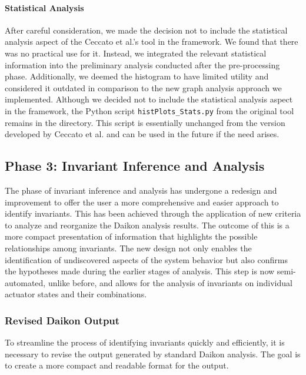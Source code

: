 \paragraph{Statistical Analysis} After careful consideration, we made the decision not to include the statistical analysis aspect of the Ceccato et al.'s tool in the framework. We found that there was no practical use for it. Instead, we integrated the relevant statistical information into the preliminary analysis conducted after the pre-processing phase. Additionally, we deemed the histogram to have limited utility and considered it outdated in comparison to the new graph analysis approach we implemented. \newline
Although we decided not to include the statistical analysis aspect in the framework, the Python script \texttt{histPlots\_Stats.py} from the original tool remains in the directory. This script is essentially unchanged from the version developed by Ceccato et al. and can be used in the future if the need arises. 

\subsection{Phase 3: Invariant Inference and Analysis}
\label{subsec:4_improve_invariants}
The phase of invariant inference and analysis has undergone a redesign and improvement to offer the user a more comprehensive and easier approach to identify invariants. This has been achieved through the application of new criteria to analyze and reorganize the Daikon analysis results. The outcome of this is a more compact presentation of information that highlights the possible relationships among invariants.\newline
The new design not only enables the identification of undiscovered aspects of the system behavior but also confirms the hypotheses made during the earlier stages of analysis. This step is now semi-automated, unlike before, and allows for the analysis of invariants on individual actuator states and their combinations.

\subsubsection{Revised Daikon Output}
\label{subsub:4_new_daikon_output}
To streamline the process of identifying invariants quickly and efficiently, it is necessary to revise the output generated by standard Daikon analysis. The goal is to create a more compact and readable format for the output.

